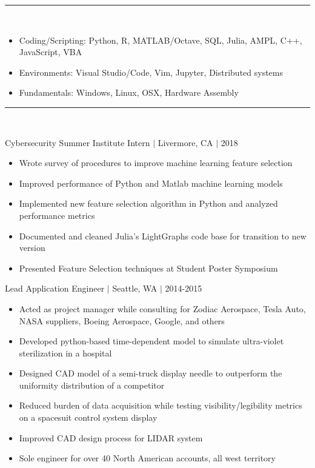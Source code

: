 \documentclass[11pt]{article}
\begin{document}
\vspace{8pt}\hrule\vspace{10pt}
\\
\vspace{-10pt}

\begin{itemize}
\item Coding/Scripting: Python, R, MATLAB/Octave, SQL, Julia, AMPL, C++, JavaScript, VBA
\item Environments: Visual Studio/Code, Vim, Jupyter, Distributed systems
\item Fundamentals: Windows, Linux, OSX, Hardware Assembly
\end{itemize}

\vspace{8pt}\hrule\vspace{10pt}
\\
\vspace{-8pt}

\hfill{Cybersecurity Summer Institute Intern $|$ Livermore, CA $|$ 2018}

\begin{itemize}
\item Wrote survey of procedures to improve machine learning feature selection
\item Improved performance of Python and Matlab machine learning models
\item Implemented new feature selection algorithm in Python and analyzed performance metrics
\item Documented and cleaned Julia's LightGraphs code base for transition to new version
\item Presented Feature Selection techniques at Student Poster Symposium
\end{itemize}

\hfill { Lead Application Engineer $|$ Seattle, WA $|$ 2014-2015}

\begin{itemize}
\item Acted as project manager while consulting for Zodiac Aerospace, Tesla Auto, NASA suppliers, Boeing Aerospace, Google, and others
\item Developed python-based time-dependent model to simulate ultra-violet sterilization in a hospital
\item Designed CAD model of a semi-truck display needle to outperform the uniformity distribution of a competitor
\item Reduced burden of data acquisition while testing visibility/legibility metrics on a spacesuit control system display
\item Improved CAD design process for LIDAR system
\item Sole engineer for over 40 North American accounts, all west territory
\end{itemize}
\end{document}
